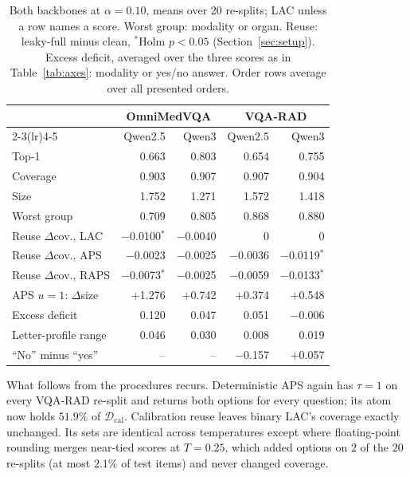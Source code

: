 \documentclass[a4paper,conference]{IEEEtran}
\newcommand{\Dcal}{\mathcal{D}_{\mathrm{cal}}}
\begin{document}
\begin{table}[tb]
\caption{Both backbones at $\alpha=0.10$, means over 20 re-splits; LAC unless
a row names a score. Worst group: modality or organ. Reuse: leaky-full minus
clean, $^{*}$Holm $p<0.05$ (Section~\ref{sec:setup}). Excess deficit, averaged
over the three scores as in Table~\ref{tab:axes}: modality or yes/no answer.
Order rows average over all presented orders.}
\label{tab:backbone}
\centering
\footnotesize
\setlength{\tabcolsep}{4pt}
\begin{tabular}{lrrrr}
\toprule
 & \multicolumn{2}{c}{OmniMedVQA} & \multicolumn{2}{c}{VQA-RAD} \\
\cmidrule(lr){2-3}\cmidrule(lr){4-5}
 & Qwen2.5 & Qwen3 & Qwen2.5 & Qwen3 \\
\midrule
Top-1 & 0.663 & 0.803 & 0.654 & 0.755 \\
Coverage & 0.903 & 0.907 & 0.907 & 0.904 \\
Size & 1.752 & 1.271 & 1.572 & 1.418 \\
Worst group & 0.709 & 0.805 & 0.868 & 0.880 \\
\midrule
Reuse $\Delta$cov., LAC & $-$0.0100$^{*}$ & $-$0.0040 & 0 & 0 \\
Reuse $\Delta$cov., APS & $-$0.0023 & $-$0.0025 & $-$0.0036 & $-$0.0119$^{*}$ \\
Reuse $\Delta$cov., RAPS & $-$0.0073$^{*}$ & $-$0.0025 & $-$0.0059 & $-$0.0133$^{*}$ \\
APS $u=1$: $\Delta$size & $+$1.276 & $+$0.742 & $+$0.374 & $+$0.548 \\
\midrule
Excess deficit & 0.120 & 0.047 & 0.051 & $-$0.006 \\
Letter-profile range & 0.046 & 0.030 & 0.008 & 0.019 \\
``No'' minus ``yes'' & -- & -- & $-$0.157 & $+$0.057 \\
\bottomrule
\end{tabular}
\end{table}

What follows from the procedures recurs. Deterministic APS again has
$\tau=1$ on every VQA-RAD re-split and returns both options for every question;
its atom now holds $51.9\%$ of $\Dcal$. Calibration reuse leaves binary LAC's
coverage exactly unchanged. Its sets are identical across temperatures except
where floating-point rounding merges near-tied scores at $T=0.25$, which added
options on $2$ of the $20$ re-splits (at most $2.1\%$ of test items) and never
changed coverage.
\end{document}
